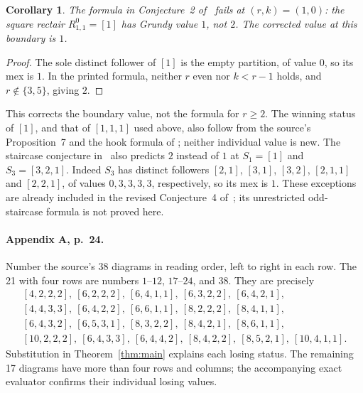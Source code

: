 \documentclass[11pt]{article}
\newtheorem{corollary}[theorem]{Corollary}
\begin{document}
\begin{corollary}\label{cor:boundary}
The formula in Conjecture~2 of~\cite[Section~5, p.~18]{BGK} fails at
$(r,k)=(1,0)$: the square rectair $R^0_{1,1}=[1]$ has Grundy value $1$,
not $2$. The corrected value at this boundary is $1$.
\end{corollary}
\begin{proof}
The sole distinct follower of $[1]$ is the empty partition, of value $0$,
so its mex is $1$. In the printed formula, neither $r$ even nor $k<r-1$
holds, and $r\notin\{3,5\}$, giving $2$.
\end{proof}
This corrects the boundary value, not the formula for $r\ge2$.
The winning status of $[1]$, and that of $[1,1,1]$ used above, also
follow from the source's Proposition~7 and the hook formula of
\cite[Theorem~4.1]{BGK22}; neither individual value is new.
The staircase conjecture in~\cite[Section~6, Conjecture~1]{BGK22}
also predicts $2$ instead of $1$ at $S_1=[1]$ and $S_3=[3,2,1]$.
Indeed $S_3$ has distinct followers $[2,1]$, $[3,1]$, $[3,2]$,
$[2,1,1]$ and $[2,2,1]$, of values $0,3,3,3,3$, respectively,
so its mex is $1$.
These exceptions are already included in the revised Conjecture~4
of~\cite{BGK}; its unrestricted odd-staircase formula is not proved here.

\paragraph{Appendix A, p.~24.}
Number the source's 38 diagrams in reading order, left to right in each
row. The 21 with four rows are numbers $1$--$12$, $17$--$24$, and $38$.
They are precisely
\[
\begin{gathered}
[4,2,2,2],\ [6,2,2,2],\ [6,4,1,1],\ [6,3,2,2],\ [6,4,2,1],\\
[4,4,3,3],\ [6,4,2,2],\ [6,6,1,1],\ [8,2,2,2],\ [8,4,1,1],\\
[6,4,3,2],\ [6,5,3,1],\ [8,3,2,2],\ [8,4,2,1],\ [8,6,1,1],\\
[10,2,2,2],\ [6,4,3,3],\ [6,4,4,2],\ [8,4,2,2],\ [8,5,2,1],\ [10,4,1,1].
\end{gathered}
\]
Substitution in Theorem~\ref{thm:main} explains each losing status.
The remaining 17 diagrams have more than four rows and columns; the
accompanying exact evaluator confirms their individual losing values.
\end{document}
